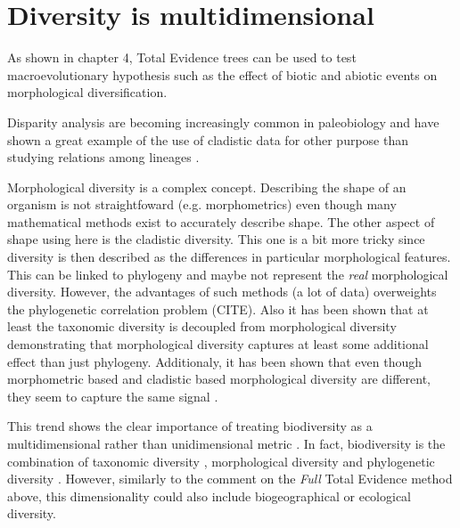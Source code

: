 \section{Diversity is multidimensional}
As shown in chapter 4, Total Evidence trees can be used to test macroevolutionary hypothesis such as the effect of biotic and abiotic events on morphological diversification.

Disparity analysis are becoming increasingly common in paleobiology and have shown a great example of the use of cladistic data for other purpose than studying relations among lineages \citep[e.g.]{Butler2012,brusattedinosaur2012,toljagictriassic-jurassic2013,brusattegradual2014,bensonfaunal2014,Claddis,Close2015}.

Morphological diversity is a complex concept.
Describing the shape of an organism is not straightfoward (e.g. morphometrics) even though many mathematical methods exist to accurately describe shape.
The other aspect of shape using here is the cladistic diversity.
This one is a bit more tricky since diversity is then described as the differences in particular morphological features.
This can be linked to phylogeny and maybe not represent the \textit{real} morphological diversity.
However, the advantages of such methods (a lot of data) overweights the phylogenetic correlation problem (CITE).
Also it has been shown that at least the taxonomic diversity is decoupled from morphological diversity \citep{ruta2013,hopkinsdecoupling2013} demonstrating that morphological diversity captures at least some additional effect than just phylogeny.
Additionaly, it has been shown that even though morphometric based and cladistic based morphological diversity are different, they seem to capture the same signal \citep{foth2012different,hetherington2015cladistic}.

This trend shows the clear importance of treating biodiversity as a multidimensional rather than unidimensional metric \citep[similarly as in ecology;][]{DonohueDim}.
In fact, biodiversity is the combination of taxonomic diversity \citep[e.g.][]{Stadler12042011}, morphological diversity \citep[from cladistics or morphometrics;][]{hetherington2015cladistic} and phylogenetic diversity \citep[e.g. the evolutionary rates regimes;][]{Close2015}.
However, similarly to the comment on the \textit{Full} Total Evidence method above, this dimensionality could also include biogeographical or ecological diversity.

